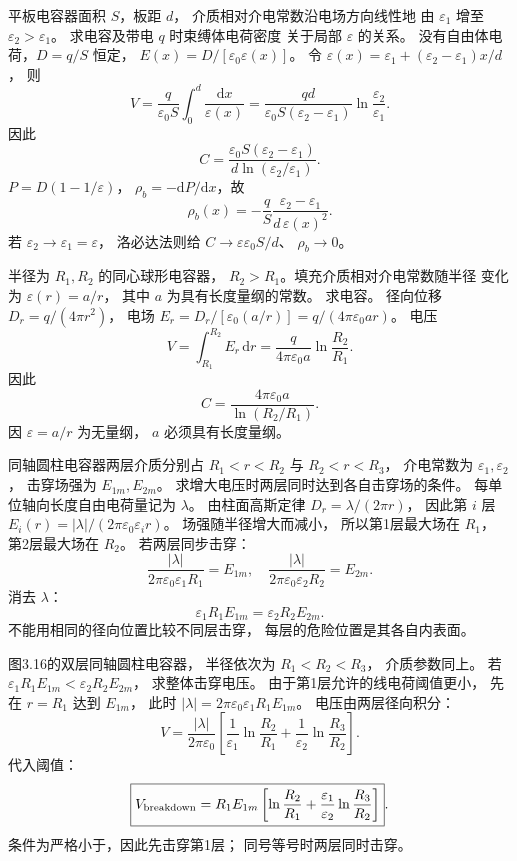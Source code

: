 平板电容器面积 $S$，板距 $d$，
介质相对介电常数沿电场方向线性地
由 $\varepsilon_1$ 增至 $\varepsilon_2>\varepsilon_1$。
求电容及带电 $q$ 时束缚体电荷密度
关于局部 $\varepsilon$ 的关系。
\exsolution
没有自由体电荷，$D=q/S$ 恒定，
$E(x)=D/[\varepsilon_0\varepsilon(x)]$。
令
$\varepsilon(x)=\varepsilon_1+
(\varepsilon_2-\varepsilon_1)x/d$，
则
\[
V=\frac{q}{\varepsilon_0S}
\int_0^d\frac{\mathrm dx}{\varepsilon(x)}
=\frac{qd}{\varepsilon_0S(\varepsilon_2-\varepsilon_1)}
\ln\frac{\varepsilon_2}{\varepsilon_1}.
\]
因此
\[
\boxed{C=
\frac{\varepsilon_0S(\varepsilon_2-\varepsilon_1)}
{d\ln(\varepsilon_2/\varepsilon_1)}}.
\]
$P=D(1-1/\varepsilon)$，
$\rho_b=-\mathrm dP/\mathrm dx$，故
\[
\boxed{\rho_b(x)=
-\frac{q}{S}\frac{\varepsilon_2-\varepsilon_1}
{d\,\varepsilon(x)^2}}.
\]
\excheck 若 $\varepsilon_2\to\varepsilon_1=\varepsilon$，
洛必达法则给 $C\to\varepsilon\varepsilon_0S/d$、
$\rho_b\to0$。

半径为 $R_1,R_2$ 的同心球形电容器，
$R_2>R_1$。填充介质相对介电常数随半径
变化为 $\varepsilon(r)=a/r$，
其中 $a$ 为具有长度量纲的常数。
求电容。
\exsolution
径向位移
$D_r=q/(4\pi r^2)$，
电场
$E_r=D_r/[\varepsilon_0(a/r)]
=q/(4\pi\varepsilon_0 a r)$。
电压
\[
V=\int_{R_1}^{R_2}E_r\,\mathrm dr
=\frac{q}{4\pi\varepsilon_0a}
\ln\frac{R_2}{R_1}.
\]
因此
\[
\boxed{C=\frac{4\pi\varepsilon_0a}
{\ln(R_2/R_1)}}.
\]
\excheck 因 $\varepsilon=a/r$ 为无量纲，
$a$ 必须具有长度量纲。

同轴圆柱电容器两层介质分别占
$R_1<r<R_2$ 与 $R_2<r<R_3$，
介电常数为 $\varepsilon_1,\varepsilon_2$，
击穿场强为 $E_{1m},E_{2m}$。
求增大电压时两层同时达到各自击穿场的条件。
\exsolution
每单位轴向长度自由电荷量记为 $\lambda$。
由柱面高斯定律
$D_r=\lambda/(2\pi r)$，
因此第 $i$ 层
$E_i(r)=|\lambda|/(2\pi\varepsilon_0\varepsilon_i r)$。
场强随半径增大而减小，
所以第1层最大场在 $R_1$，
第2层最大场在 $R_2$。
若两层同步击穿：
\[
\frac{|\lambda|}{2\pi\varepsilon_0\varepsilon_1R_1}
=E_{1m},\quad
\frac{|\lambda|}{2\pi\varepsilon_0\varepsilon_2R_2}
=E_{2m}.
\]
消去 $\lambda$：
\[
\boxed{\varepsilon_1R_1E_{1m}
=\varepsilon_2R_2E_{2m}}.
\]
\excheck 不能用相同的径向位置比较不同层击穿，
每层的危险位置是其各自内表面。

图3.16的双层同轴圆柱电容器，
半径依次为 $R_1<R_2<R_3$，
介质参数同上。
若
$\varepsilon_1R_1E_{1m}<
\varepsilon_2R_2E_{2m}$，
求整体击穿电压。
\exsolution
由于第1层允许的线电荷阈值更小，
先在 $r=R_1$ 达到 $E_{1m}$，
此时
$|\lambda|=2\pi\varepsilon_0\varepsilon_1R_1E_{1m}$。
电压由两层径向积分：
\[
V=\frac{|\lambda|}{2\pi\varepsilon_0}
\left[\frac1{\varepsilon_1}\ln\frac{R_2}{R_1}
+\frac1{\varepsilon_2}\ln\frac{R_3}{R_2}\right].
\]
代入阈值：
\[
\boxed{V_{\rm breakdown}=
R_1E_{1m}
\left[\ln\frac{R_2}{R_1}
+\frac{\varepsilon_1}{\varepsilon_2}\ln\frac{R_3}{R_2}\right]}.
\]
\excheck 条件为严格小于，因此先击穿第1层；
同号等号时两层同时击穿。

